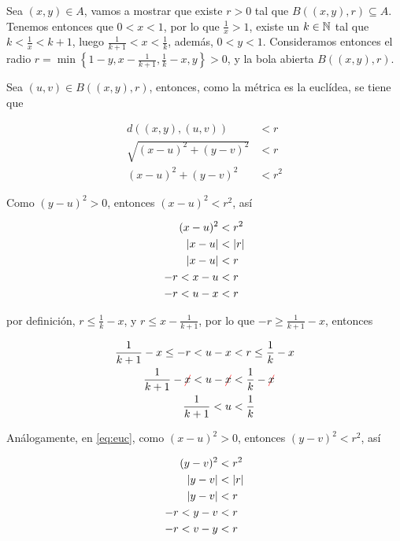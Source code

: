 \documentclass{amsart}
\begin{document}
{    Sea $(x,y) \in A$, vamos a mostrar que existe $r>0$ tal que $B((x,y), r) \subseteq A$. Tenemos entonces que $ 0<x<1$, por lo que $ \frac{1}{x} > 1$, existe un $k \in \mathbb{N}$ tal que $k < \frac{1}{x} < k + 1$, luego $\frac{1}{k+1} < x < \frac{1}{k}$, además, $ 0 < y < 1$. Consideramos entonces el radio $r = \min\left\{ 1-y, x - \frac{1}{k+1}, \frac{1}{k} - x, y \right\} > 0$, y la bola abierta $B((x,y), r)$.

    Sea $(u,v) \in B((x,y), r)$, entonces, como la métrica es la euclídea, se tiene que
    
    \begin{align}
        d((x,y), (u,v)) &< r \nonumber \\ 
        \sqrt{ (x-u)^2 + (y-v)^2 } &< r \nonumber \\
        (x-u)^2 + (y-v)^2 &< r^2 \label{eq:euc}
    \end{align}
    
    Como $(y-u)^2 > 0$, entonces $(x-u)^2 < r^2$, así

    \begin{align*}
        (x-u)^2 &< r^2 \\
        \left\lvert x-u \right\rvert &< \left\lvert r \right\rvert \\
        \left\lvert x-u \right\rvert &< r \\
        -r < x-u &< r \\
        -r < u-x &< r \\
    \end{align*}

    por definición, $ r \leq \frac{1}{k} - x$, y $r \leq x - \frac{1}{k+1}$, por lo que $-r \geq \frac{1}{k+1} - x$, entonces

    \begin{align*}
        \frac{1}{k+1} - x \leq -r < u - x &< r \leq \frac{1}{k} - x \\
        \frac{1}{k+1} - \cancelc[red]{x} < u - \cancelc[red]{x} &< \frac{1}{k} - \cancelc[red]{x} \\
        \frac{1}{k+1} < u &< \frac{1}{k} \\
    \end{align*}

    Análogamente, en \eqref{eq:euc}, como $(x-u)^2 > 0$, entonces $(y-v)^2 < r^2$, así

    \begin{align*}
        (y-v)^2 &< r^2 \\
        \left\lvert y-v \right\rvert &< \left\lvert r \right\rvert \\
        \left\lvert y-v \right\rvert &< r \\
        -r < y-v &< r \\
        -r < v-y &< r \\
    \end{align*}

}
\end{document}
